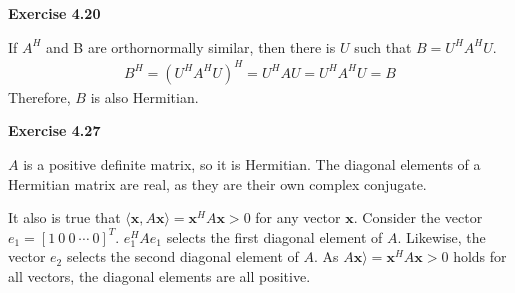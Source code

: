 \documentclass[letterpaper,12pt]{article}
\newcommand{\vect}[1]{\mathbf{#1}}
\begin{document}
\textbf{Exercise 4.20}

If $A^H$ and B are orthornormally similar, then there is $U$ such that $B = U^HA^HU$.
\begin{align*}
B^H = (U^HA^HU)^H = U^H A U = U^H A^H U = B
\end{align*}
Therefore, $B$ is also Hermitian.

\textbf{Exercise 4.27}

$A$ is a positive definite matrix, so it is Hermitian. The diagonal elements of a Hermitian matrix are real, as they are their own complex conjugate.

It also is true that $\langle \vect{x},  A\vect{x} \rangle = \vect{x}^H A \vect{x} > 0$ for any vector $\vect{x}$. Consider the vector $e_1 = [1 \ 0 \ 0 \ \cdots \ 0]^T$. $e_1^H A e_1$ selects the first diagonal element of $A$. Likewise, the vector $e_2$ selects the second diagonal element of $A$. As $A\vect{x} \rangle = \vect{x}^H A \vect{x} > 0$ holds for all vectors, the diagonal elements are all positive.
\end{document}
